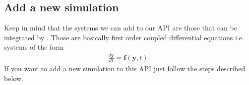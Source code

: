 \documentclass[a4paper,landscape,10pt,english]{sphinxmanual}
\begin{document}
\subsection{Add a new simulation}
\label{\detokenize{code_docs/new_simulation:add-a-new-simulation}}\label{\detokenize{code_docs/new_simulation:code-new-simulation}}\label{\detokenize{code_docs/new_simulation::doc}}
Keep in mind that the systems we can add to our API are those that can be
integrated by . Those are basically first order
coupled differential equations i.e. systems of the form
\begin{equation*}
\begin{split}\frac{d\mathbf{y}}{dt} = \mathbf{f}(\mathbf{y}, t).\end{split}
\end{equation*}
If you want to add a new simulation to this API just follow the steps described
below.
\end{document}
